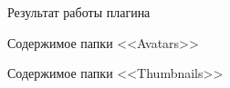 \clearpage

\begin{figure}[h!]
\caption{ Результат работы плагина }
\label{kucher_8:kucher_8}
\end{figure} 

\begin{figure}[h!]
\caption{ Содержимое папки <<Avatars>> }
\label{kucher_9:kucher_9}
\end{figure} 

\begin{figure}[h!]
\caption{ Содержимое папки <<Thumbnails>> }
\label{kucher_10:kucher_10}
\end{figure} 

\clearpage
